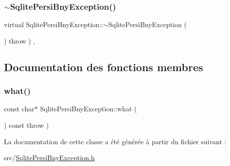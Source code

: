 \subsubsection{\texorpdfstring{$\sim$\+Sqlite\+Persi\+Bny\+Exception()}{~SqlitePersiBnyException()}}
{\footnotesize\ttfamily virtual Sqlite\+Persi\+Bny\+Exception\+::$\sim$\+Sqlite\+Persi\+Bny\+Exception (\begin{DoxyParamCaption}{ }\end{DoxyParamCaption}) throw  ) \hspace{0.3cm}{\ttfamily [inline]}, {\ttfamily [virtual]}}



\subsection{Documentation des fonctions membres}
\mbox{\label{classSqlitePersiBnyException_ac1ff5b82a1a2f3ff35b1c90ddc7356d7}} 
\subsubsection{\texorpdfstring{what()}{what()}}
{\footnotesize\ttfamily const char$\ast$ Sqlite\+Persi\+Bny\+Exception\+::what (\begin{DoxyParamCaption}{ }\end{DoxyParamCaption}) const throw  ) \hspace{0.3cm}{\ttfamily [inline]}}



La documentation de cette classe a été générée à partir du fichier suivant \+:\begin{DoxyCompactItemize}
\item 
src/\hyperlink{SqlitePersiBnyException_8h}{Sqlite\+Persi\+Bny\+Exception.\+h}\end{DoxyCompactItemize}

